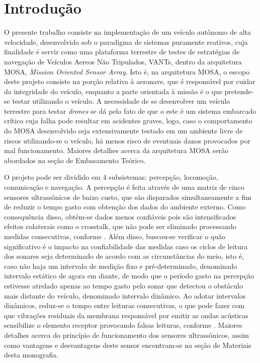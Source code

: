 
\chapter[Introdução]{Introdução}

O presente trabalho consiste na implementação de um veículo autônomo de alta
velocidade, desenvolvido sob o paradigma de sistemas puramente reativos, cuja finalidade
é servir como uma plataforma terrestre de testes de estratégias de navegação de Veículos
Aereos Não Tripulados, VANTs, dentro da arquitetura MOSA, \textit{Mission Oriented Sensor
Array}. Isto é, na arquitetura MOSA, o escopo deste projeto consiste na porção relativa
à aeronave, que é responsável por cuidar da integridade do veículo, enquanto a parte
orientada à missão é o que pretende-se testar utilizando o veículo. A necessidade de
se desenvolver um veículo terrestre para testar \textit{drones} se dá pelo fato de que o este é
um sistema embarcado crítico cuja falha pode resultar em acidentes graves, logo, caso o
comportamento do MOSA desenvolvido seja extensivamente testado em um ambiente livre
de riscos utilizando-se o veículo, há menos risco de eventuais danos provocados por mal
funcionamento. Maiores detalhes acerca da arquitetura MOSA serão abordados na seção
de Embasamento Teórico.

O projeto pode ser dividido em 4 subsistemas: percepção, locomoção, comunicação
e navegação. A percepção é feita através de uma matriz de cinco sensores ultrassônicos
de baixo custo, que são disparados simultaneamente a fim de reduzir o tempo gasto
com obtenção dos dados do ambiente externo. Como consequência disso, obtém-se dados
menos confiáveis pois são intensificados efeitos colaterais como o crosstalk, que não pode ser
eliminado processando medidas consecutivas, conforme \cite{2016_artigo_1}. Além disso, buscou-se verificar
o quão significativo é o impacto na confiabilidade das medidas caso os ciclos de leitura dos
sonares seja determinado de acordo com as circunstâncias do meio, isto é, caso não haja
um intervalo de medição fixo e pré-determinado, denominado intervalo estático de agora
em diante, de modo que o período gasto na percepção estivesse atrelado apenas ao tempo
gasto pelo sonar que detectou o obstáculo mais distante do veículo, denominado intervalo
dinâmico. Ao adotar intervalos dinâmicos, reduz-se o tempo entre leituras consecutivas,
o que pode fazer com que vibrações residuais da membrana responsável por emitir as
ondas acústicas sensibilize o elemento receptor provocando falsas leituras, conforme \cite{jones}.
Maiores detalhes acerca do princípio de funcionamento dos sensores ultrassônicos, assim
como vantagens e desvantagens deste sensor encontram-se na seção de Materiais desta
monografia.

